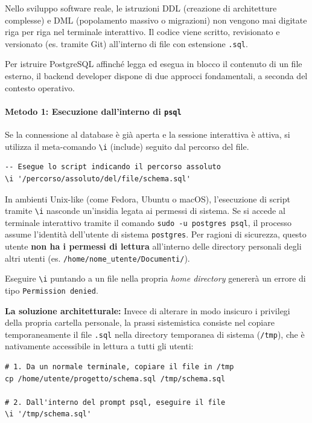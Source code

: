 Nello sviluppo software reale, le istruzioni DDL (creazione di architetture complesse) e DML (popolamento massivo o migrazioni) non vengono mai digitate riga per riga nel terminale interattivo. Il codice viene scritto, revisionato e versionato (es. tramite Git) all'interno di file con estensione \texttt{.sql}. 

Per istruire PostgreSQL affinché legga ed esegua in blocco il contenuto di un file esterno, il backend developer dispone di due approcci fondamentali, a seconda del contesto operativo.

\paragraph{Metodo 1: Esecuzione dall'interno di \texttt{psql}}
Se la connessione al database è già aperta e la sessione interattiva è attiva, si utilizza il meta-comando \texttt{\textbackslash i} (include) seguito dal percorso del file.

\begin{lstlisting}[language=PostgreSQL, title=Esecuzione interattiva di un file SQL]
-- Esegue lo script indicando il percorso assoluto
\i '/percorso/assoluto/del/file/schema.sql'
\end{lstlisting}

\begin{warningbox}
In ambienti Unix-like (come Fedora, Ubuntu o macOS), l'esecuzione di script tramite \texttt{\textbackslash i} nasconde un'insidia legata ai permessi di sistema. 
Se si accede al terminale interattivo tramite il comando \texttt{sudo -u postgres psql}, il processo assume l'identità dell'utente di sistema \texttt{postgres}. Per ragioni di sicurezza, questo utente \textbf{non ha i permessi di lettura} all'interno delle directory personali degli altri utenti (es. \texttt{/home/nome\_utente/Documenti/}).

Eseguire \texttt{\textbackslash i} puntando a un file nella propria \textit{home directory} genererà un errore di tipo \texttt{Permission denied}.

\textbf{La soluzione architetturale:}
Invece di alterare in modo insicuro i privilegi della propria cartella personale, la prassi sistemistica consiste nel copiare temporaneamente il file \texttt{.sql} nella directory temporanea di sistema (\texttt{/tmp}), che è nativamente accessibile in lettura a tutti gli utenti:

\begin{lstlisting}[language=TerminalBash]
# 1. Da un normale terminale, copiare il file in /tmp
cp /home/utente/progetto/schema.sql /tmp/schema.sql

# 2. Dall'interno del prompt psql, eseguire il file
\i '/tmp/schema.sql'
\end{lstlisting}
\end{warningbox}

